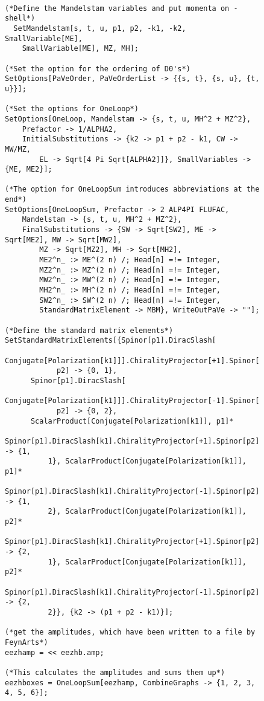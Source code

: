 \begin{figure}[H]
\begin{footnotesize}
\begin{verbatim}

(*Define the Mandelstam variables and put momenta on - shell*)
  SetMandelstam[s, t, u, p1, p2, -k1, -k2, SmallVariable[ME], 
    SmallVariable[ME], MZ, MH];

(*Set the option for the ordering of D0's*)
SetOptions[PaVeOrder, PaVeOrderList -> {{s, t}, {s, u}, {t, u}}];

(*Set the options for OneLoop*)
SetOptions[OneLoop, Mandelstam -> {s, t, u, MH^2 + MZ^2}, 
    Prefactor -> 1/ALPHA2, 
    InitialSubstitutions -> {k2 -> p1 + p2 - k1, CW -> MW/MZ, 
        EL -> Sqrt[4 Pi Sqrt[ALPHA2]]}, SmallVariables -> {ME, ME2}];

(*The option for OneLoopSum introduces abbreviations at the end*)
SetOptions[OneLoopSum, Prefactor -> 2 ALP4PI FLUFAC, 
    Mandelstam -> {s, t, u, MH^2 + MZ^2}, 
    FinalSubstitutions -> {SW -> Sqrt[SW2], ME -> Sqrt[ME2], MW -> Sqrt[MW2], 
        MZ -> Sqrt[MZ2], MH -> Sqrt[MH2], 
        ME2^n_ :> ME^(2 n) /; Head[n] =!= Integer, 
        MZ2^n_ :> MZ^(2 n) /; Head[n] =!= Integer, 
        MW2^n_ :> MW^(2 n) /; Head[n] =!= Integer, 
        MH2^n_ :> MH^(2 n) /; Head[n] =!= Integer, 
        SW2^n_ :> SW^(2 n) /; Head[n] =!= Integer, 
        StandardMatrixElement -> MBM}, WriteOutPaVe -> ""];

(*Define the standard matrix elements*)
SetStandardMatrixElements[{Spinor[p1].DiracSlash[
            Conjugate[Polarization[k1]]].ChiralityProjector[+1].Spinor[
            p2] -> {0, 1}, 
      Spinor[p1].DiracSlash[
            Conjugate[Polarization[k1]]].ChiralityProjector[-1].Spinor[
            p2] -> {0, 2}, 
      ScalarProduct[Conjugate[Polarization[k1]], p1]*
          Spinor[p1].DiracSlash[k1].ChiralityProjector[+1].Spinor[p2] -> {1, 
          1}, ScalarProduct[Conjugate[Polarization[k1]], p1]*
          Spinor[p1].DiracSlash[k1].ChiralityProjector[-1].Spinor[p2] -> {1, 
          2}, ScalarProduct[Conjugate[Polarization[k1]], p2]*
          Spinor[p1].DiracSlash[k1].ChiralityProjector[+1].Spinor[p2] -> {2, 
          1}, ScalarProduct[Conjugate[Polarization[k1]], p2]*
          Spinor[p1].DiracSlash[k1].ChiralityProjector[-1].Spinor[p2] -> {2, 
          2}}, {k2 -> (p1 + p2 - k1)}];

(*get the amplitudes, which have been written to a file by FeynArts*)
eezhamp = << eezhb.amp;

(*This calculates the amplitudes and sums them up*)
eezhboxes = OneLoopSum[eezhamp, CombineGraphs -> {1, 2, 3, 4, 5, 6}];


\end{verbatim}
\end{footnotesize}
\end{figure}
